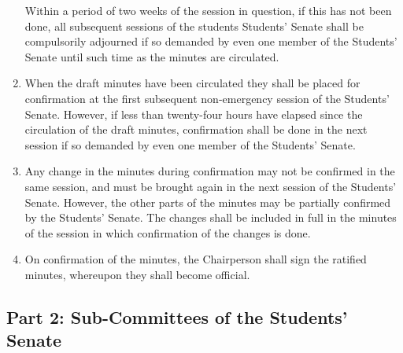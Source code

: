 \begin{enumerate}
  Within a period of two weeks of the session in question, if this has
  not been done, all subsequent sessions of the students Students'
  Senate shall be compulsorily adjourned if so demanded by even one
  member of the Students' Senate until such time as the minutes are
  circulated.
\item
  When the draft minutes have been circulated they shall be placed for
  confirmation at the first subsequent non-emergency session of the
  Students' Senate. However, if less than twenty-four hours have elapsed
  since the circulation of the draft minutes, confirmation shall be done
  in the next session if so demanded by even one member of the Students'
  Senate.
\item
  Any change in the minutes during confirmation may not be confirmed in
  the same session, and must be brought again in the next session of the
  Students' Senate. However, the other parts of the minutes may be
  partially confirmed by the Students' Senate. The changes shall be
  included in full in the minutes of the session in which confirmation
  of the changes is done.
\item
  On confirmation of the minutes, the Chairperson shall sign the
  ratified minutes, whereupon they shall become official.
\end{enumerate}

\subsection{Part 2: Sub-Committees of the Students'
Senate}\label{part-2-sub-committees-of-the-students-senate}

